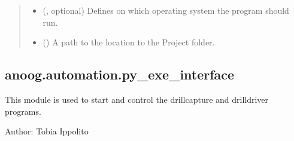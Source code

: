 \documentclass[letterpaper,10pt,english]{sphinxmanual}
\begin{document}
\begin{fulllineitems}
\begin{quote}
\begin{description}
\begin{itemize}
\item {} 
\sphinxAtStartPar
{} ({\hyperref[\detokenize{anoog.automation:anoog.automation.py_exe_interface.op}]{}}, optional) \textendash{} Defines on which operating system the program should run.

\item {} 
\sphinxAtStartPar
{} (\sphinxstyleliteralemphasis{\sphinxupquote{, }}) \textendash{} A path to the location to the Project folder.

\end{itemize}

\end{description}\end{quote}

\end{fulllineitems}



\subsection{anoog.automation.py\_exe\_interface}
\label{\detokenize{anoog.automation:module-anoog.automation.py_exe_interface}}\label{\detokenize{anoog.automation:anoog-automation-py-exe-interface}}
\sphinxAtStartPar
This module is used to start and control the drillcapture and drilldriver programs.

\sphinxAtStartPar
Author: Tobia Ippolito
\end{document}
